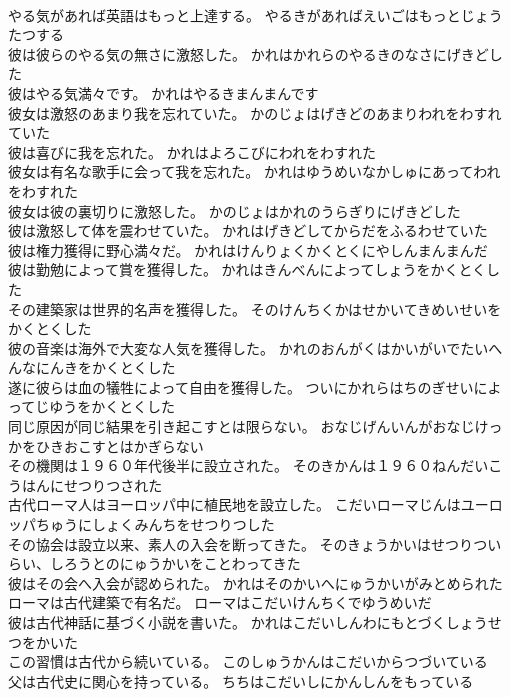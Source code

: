 \documentclass[8pt]{extreport}
\begin{document}
\begin{CJK}{UTF8}{min}
\\	やる気があれば英語はもっと上達する。	やるきがあればえいごはもっとじょうたつする 
\\	彼は彼らのやる気の無さに激怒した。	かれはかれらのやるきのなさにげきどした 
\\	彼はやる気満々です。	かれはやるきまんまんです 
\\	彼女は激怒のあまり我を忘れていた。	かのじょはげきどのあまりわれをわすれていた 
\\	彼は喜びに我を忘れた。	かれはよろこびにわれをわすれた 
\\	彼女は有名な歌手に会って我を忘れた。	かれはゆうめいなかしゅにあってわれをわすれた 
\\	彼女は彼の裏切りに激怒した。	かのじょはかれのうらぎりにげきどした 
\\	彼は激怒して体を震わせていた。	かれはげきどしてからだをふるわせていた 
\\	彼は権力獲得に野心満々だ。	かれはけんりょくかくとくにやしんまんまんだ 
\\	彼は勤勉によって賞を獲得した。	かれはきんべんによってしょうをかくとくした 
\\	その建築家は世界的名声を獲得した。	そのけんちくかはせかいてきめいせいをかくとくした 
\\	彼の音楽は海外で大変な人気を獲得した。	かれのおんがくはかいがいでたいへんなにんきをかくとくした 
\\	遂に彼らは血の犠牲によって自由を獲得した。	ついにかれらはちのぎせいによってじゆうをかくとくした 
\\	同じ原因が同じ結果を引き起こすとは限らない。	おなじげんいんがおなじけっかをひきおこすとはかぎらない 
\\	その機関は１９６０年代後半に設立された。	そのきかんは１９６０ねんだいこうはんにせつりつされた 
\\	古代ローマ人はヨーロッパ中に植民地を設立した。	こだいローマじんはユーロッパちゅうにしょくみんちをせつりつした 
\\	その協会は設立以来、素人の入会を断ってきた。	そのきょうかいはせつりついらい、しろうとのにゅうかいをことわってきた 
\\	彼はその会へ入会が認められた。	かれはそのかいへにゅうかいがみとめられた 
\\	ローマは古代建築で有名だ。	ローマはこだいけんちくでゆうめいだ 
\\	彼は古代神話に基づく小説を書いた。	かれはこだいしんわにもとづくしょうせつをかいた 
\\	この習慣は古代から続いている。	このしゅうかんはこだいからつづいている 
\\	父は古代史に関心を持っている。	ちちはこだいしにかんしんをもっている 

\end{CJK}
\end{document}
